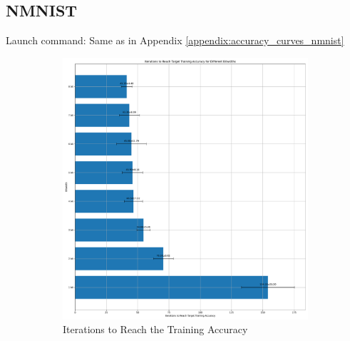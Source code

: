     \subsection{NMNIST}
    \label{appendix:iterations_nmnist}
        Launch command: Same as in Appendix \ref{appendix:accuracy_curves_nmnist}
        \begin{figure}[H]
            \centering
            \begin{subfigure}[H]{0.48\textwidth}
                \centering
                \includegraphics[width=\textwidth]{../standard/NMNIST/plots/nmnist_train_iters.pdf}
                \caption{Iterations to Reach the Training Accuracy}
            \end{subfigure}
            \hfill
            \begin{subfigure}[H]{0.48\textwidth}
                \centering

\end{subfigure}
\end{figure}
